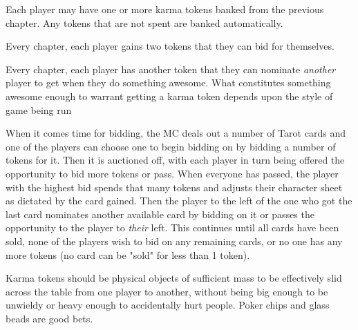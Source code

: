 \begin{itemize*}
\item Each player may have one or more karma tokens banked from the previous chapter. Any tokens that are not spent are banked automatically.
\item Every chapter, each player gains two tokens that they can bid for themselves.
\item Every chapter, each player has another token that they can nominate \textit{another} player to get when they do something awesome. What constitutes something awesome enough to warrant getting a karma token depends upon the style of game being run
\end{itemize*}

When it comes time for bidding, the MC deals out a number of Tarot cards and one of the players can choose one to begin bidding on by bidding a number of tokens for it. Then it is auctioned off, with each player in turn being offered the opportunity to bid more tokens or pass. When everyone has passed, the player with the highest bid spends that many tokens and adjusts their character sheet as dictated by the card gained. Then the player to the left of the one who got the last card nominates another available card by bidding on it or passes the opportunity to the player to \textit{their} left. This continues until all cards have been sold, none of the players wish to bid on any remaining cards, or no one has any more tokens (no card can be "sold" for less than 1 token).

Karma tokens should be physical objects of sufficient mass to be effectively slid across the table from one player to another, without being big enough to be unwieldy or heavy enough to accidentally hurt people. Poker chips and glass beads are good bets.

